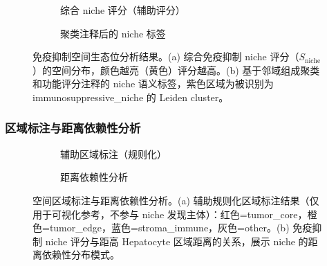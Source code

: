 \documentclass[12pt, a4paper]{ctexart}
\begin{document}
\begin{figure}[H]
\centering
\begin{subfigure}[b]{0.48\textwidth}
\caption{综合 niche 评分（辅助评分）}
\end{subfigure}
\hfill
\begin{subfigure}[b]{0.48\textwidth}
\caption{聚类注释后的 niche 标签}
\end{subfigure}
\caption{免疫抑制空间生态位分析结果。(a) 综合免疫抑制 niche 评分（$S_{\text{niche}}$）的空间分布，颜色越亮（黄色）评分越高。(b) 基于邻域组成聚类和功能评分注释的 niche 语义标签，紫色区域为被识别为 immunosuppressive\_niche 的 Leiden cluster。}
\label{fig:niche_score_spatial}
\end{figure}

\subsubsection{区域标注与距离依赖性分析}

\begin{figure}[H]
\centering
\begin{subfigure}[b]{0.48\textwidth}
\caption{辅助区域标注（规则化）}
\end{subfigure}
\hfill
\begin{subfigure}[b]{0.48\textwidth}
\caption{距离依赖性分析}
\end{subfigure}
\caption{空间区域标注与距离依赖性分析。(a) 辅助规则化区域标注结果（仅用于可视化参考，不参与 niche 发现主体）：红色=tumor\_core，橙色=tumor\_edge，蓝色=stroma\_immune，灰色=other。(b) 免疫抑制 niche 评分与距高 Hepatocyte 区域距离的关系，展示 niche 的距离依赖性分布模式。}
\label{fig:spatial_regions}
\end{figure}
\end{document}
